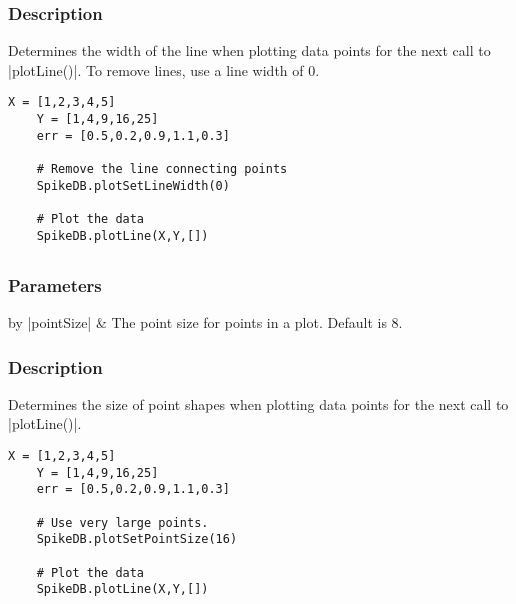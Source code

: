 \documentclass{report}
\begin{document}
\subsubsection{Description}
Determines the width of the line when plotting data points for the next call to |plotLine()|. To remove lines, use a line width of 0.
\begin{lstlisting}[caption=Example]
	X = [1,2,3,4,5]
	Y = [1,4,9,16,25]
	err = [0.5,0.2,0.9,1.1,0.3]

	# Remove the line connecting points
	SpikeDB.plotSetLineWidth(0)

	# Plot the data
	SpikeDB.plotLine(X,Y,[])
\end{lstlisting}


\clearpage
\subsection{}
\subsubsection{Parameters}
\begin{table}[h]
\begin{center}
\begin{tabular}{by}
		|pointSize| & The point size for points in a plot. Default is 8.\\ 
	\end{tabular}
\end{center}
\end{table}
\subsubsection{Description}
Determines the size of point shapes when plotting data points for the next call to |plotLine()|. 
\begin{lstlisting}[caption=Example]
	X = [1,2,3,4,5]
	Y = [1,4,9,16,25]
	err = [0.5,0.2,0.9,1.1,0.3]

	# Use very large points.
	SpikeDB.plotSetPointSize(16)

	# Plot the data
	SpikeDB.plotLine(X,Y,[])
\end{lstlisting}



\clearpage
\subsection{}
\end{document}
